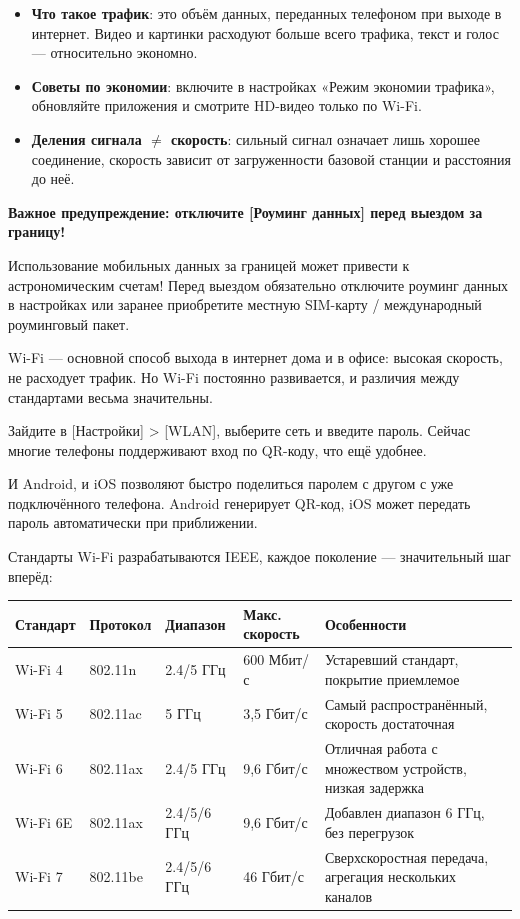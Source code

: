 
\begin{itemize}
  \item \textbf{Что такое трафик}: это объём данных, переданных телефоном при выходе в интернет. Видео и картинки расходуют больше всего трафика, текст и голос — относительно экономно.
  \item \textbf{Советы по экономии}: включите в настройках «Режим экономии трафика», обновляйте приложения и смотрите HD-видео только по Wi-Fi.
  \item \textbf{Деления сигнала $\neq$ скорость}: сильный сигнал означает лишь хорошее соединение, скорость зависит от загруженности базовой станции и расстояния до неё.
\end{itemize}

\textbf{Важное предупреждение: отключите [Роуминг данных] перед выездом за границу!}\par

Использование мобильных данных за границей может привести к астрономическим счетам! Перед выездом обязательно отключите роуминг данных в настройках или заранее приобретите местную SIM-карту / международный роуминговый пакет.


Wi-Fi — основной способ выхода в интернет дома и в офисе: высокая скорость, не расходует трафик. Но Wi-Fi постоянно развивается, и различия между стандартами весьма значительны.


Зайдите в [Настройки] > [WLAN], выберите сеть и введите пароль. Сейчас многие телефоны поддерживают вход по QR-коду, что ещё удобнее.


И Android, и iOS позволяют быстро поделиться паролем с другом с уже подключённого телефона. Android генерирует QR-код, iOS может передать пароль автоматически при приближении.


Стандарты Wi-Fi разрабатываются IEEE, каждое поколение — значительный шаг вперёд:

\begin{center}
\begin{tabularx}{\linewidth}{|X|X|X|X|X|}
\hline
\textbf{Стандарт} & \textbf{Протокол} & \textbf{Диапазон} & \textbf{Макс. скорость} & \textbf{Особенности} \tabularnewline
\hline
Wi-Fi 4 & 802.11n & 2.4/5 ГГц & 600 Мбит/с & Устаревший стандарт, покрытие приемлемое \tabularnewline
Wi-Fi 5 & 802.11ac & 5 ГГц & 3,5 Гбит/с & Самый распространённый, скорость достаточная \tabularnewline
Wi-Fi 6 & 802.11ax & 2.4/5 ГГц & 9,6 Гбит/с & Отличная работа с множеством устройств, низкая задержка \tabularnewline
Wi-Fi 6E & 802.11ax & 2.4/5/6 ГГц & 9,6 Гбит/с & Добавлен диапазон 6 ГГц, без перегрузок \tabularnewline
Wi-Fi 7 & 802.11be & 2.4/5/6 ГГц & 46 Гбит/с & Сверхскоростная передача, агрегация нескольких каналов \tabularnewline
\hline
\end{tabularx}
\end{center}

